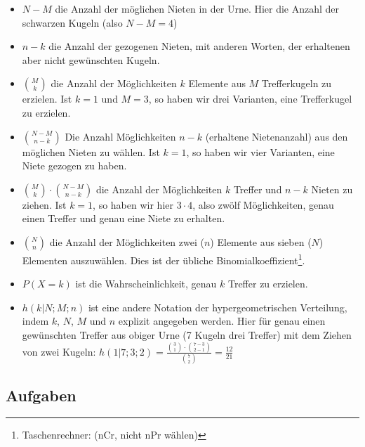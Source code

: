 \begin{itemize}
\item $N-M$ die Anzahl der möglichen Nieten in der Urne. Hier die Anzahl der schwarzen Kugeln (also $N-M = 4$)
\item $n-k$ die Anzahl der gezogenen Nieten, mit anderen Worten, der erhaltenen aber nicht gewünschten Kugeln.
\item $M\choose k$ die Anzahl der Möglichkeiten $k$ Elemente aus $M$ Trefferkugeln zu erzielen. Ist \zB $k=1$ und $M=3$, so haben wir drei Varianten, eine Trefferkugel zu erzielen.
\item ${N-M}\choose {n-k}$ Die Anzahl Möglichkeiten $n-k$ (erhaltene Nietenanzahl) aus den möglichen Nieten zu wählen. Ist \zB $k=1$, so haben wir vier Varianten, eine Niete gezogen zu haben.
\item ${M\choose k} \cdot{} {{N-M}\choose {n-k}}$ die Anzahl der Möglichkeiten $k$ Treffer und $n-k$ Nieten zu ziehen. Ist \zB $k=1$, so haben wir hier $3\cdot{}4$, also zwölf Möglichkeiten, genau einen Treffer und genau eine Niete zu erhalten.
\item $N \choose n$ die Anzahl der Möglichkeiten zwei ($n$) Elemente
  aus sieben ($N$) Elementen auszuwählen. Dies ist der übliche
  Binomialkoeffizient\footnote{Taschenrechner:  (nCr, nicht nPr wählen)}.
\item $P(X=k)$ ist die Wahrscheinlichkeit, genau $k$ Treffer zu erzielen.
\item $h(k|N;M;n)$ ist eine andere Notation der hypergeometrischen Verteilung, indem $k$, $N$, $M$ und $n$ explizit angegeben werden. Hier \zB für genau einen gewünschten Treffer aus obiger Urne (7 Kugeln drei Treffer) mit dem Ziehen von zwei Kugeln: $h(1|7;3;2)=\frac{{3 \choose 1} \cdot{} {{7-3}\choose {2-1}  }   }{{ 7 \choose 2 }}=\frac{12}{21}$
\end{itemize}

\subsection*{Aufgaben}

\newpage

